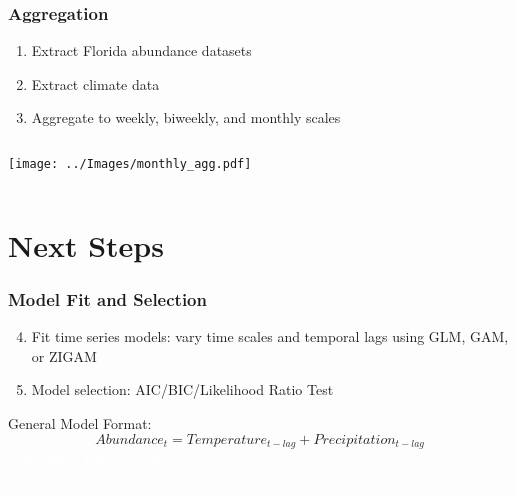 \documentclass{beamer}
\begin{document}
\begin{frame}
\frametitle{Aggregation}

\begin{enumerate}
	\item Extract Florida abundance datasets 
	
	\item Extract climate data 
	
	\item Aggregate to weekly, biweekly, and monthly scales	
\end{enumerate}


\vspace{0.7cm}
\begin{columns}
	\begin{column}{0.7\textwidth}
		\texttt{[image: ../Images/monthly\_agg.pdf]}
	\end{column}
	\begin{column}{0.3\textwidth}
		
	\end{column}
\end{columns}

\end{frame}

\section{Next Steps}

\begin{frame}
\frametitle{Model Fit and Selection}

\begin{enumerate}
	\setcounter{enumi}{3}
	\item Fit time series models: vary time scales and temporal lags using GLM, GAM, or ZIGAM
	
	\item Model selection: AIC/BIC/Likelihood Ratio Test
	
\end{enumerate}
\vspace{0.1cm}
\small
General Model Format:
$$ Abundance_t = Temperature_{t-lag} + Precipitation_{t-lag} $$
\textcolor{white}{
Generalized Linear Model:
$$ M_t = a_1T_{t-lag}^2 + a_2T_{t-lag} + b_1P_{t-lag}^2 + b_2P_{t-lag} + c$$
}
\end{frame}
\end{document}
